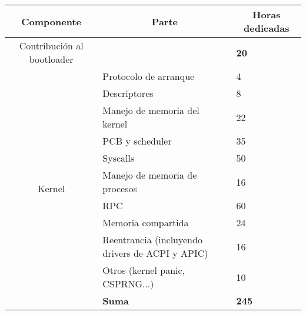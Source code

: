 \begin{table}[]

\begin{tabular}{|c|l|l|}
\hline
\textbf{Componente}                     & \multicolumn{1}{c|}{\textbf{Parte}}             & \multicolumn{1}{c|}{\textbf{Horas dedicadas}} \\ \hline
Contribución al bootloader              &                                                 & \textbf{20}                                   \\ \hline
\multirow{11}{*}{Kernel}                & Protocolo de arranque                           & 4                                             \\ \cline{2-3} 
                                        & Descriptores                                    & 8                                             \\ \cline{2-3} 
                                        & Manejo de memoria del kernel                    & 22                                            \\ \cline{2-3} 
                                        & PCB y scheduler                                 & 35                                            \\ \cline{2-3} 
                                        & Syscalls                                        & 50                                            \\ \cline{2-3} 
                                        & Manejo de memoria de procesos                   & 16                                            \\ \cline{2-3} 
                                        & RPC                                             & 60                                            \\ \cline{2-3} 
                                        & Memoria compartida                              & 24                                            \\ \cline{2-3} 
                                        & Reentrancia (incluyendo drivers de ACPI y APIC) & 16                                            \\ \cline{2-3} 
                                        & Otros (kernel panic, CSPRNG...)                 & 10                                            \\ \cline{2-3} 
                                        & \textbf{Suma}                                   & \textbf{245}                                  \\ \hline

\end{tabular}
\end{table}
